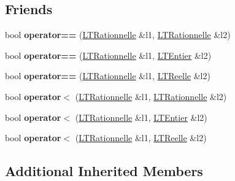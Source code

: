 \subsection*{Friends}
\begin{DoxyCompactItemize}
\item 
bool {\bfseries operator==} (\hyperlink{class_l_t_rationnelle}{L\+T\+Rationnelle} \&l1, \hyperlink{class_l_t_rationnelle}{L\+T\+Rationnelle} \&l2)\hypertarget{class_l_t_rationnelle_a4a1c3b9abfc9cf3bd7086fafb9e4ba0a}{}\label{class_l_t_rationnelle_a4a1c3b9abfc9cf3bd7086fafb9e4ba0a}

\item 
bool {\bfseries operator==} (\hyperlink{class_l_t_rationnelle}{L\+T\+Rationnelle} \&l1, \hyperlink{class_l_t_entier}{L\+T\+Entier} \&l2)\hypertarget{class_l_t_rationnelle_a876ef3ed5b945dd9d215467114da113e}{}\label{class_l_t_rationnelle_a876ef3ed5b945dd9d215467114da113e}

\item 
bool {\bfseries operator==} (\hyperlink{class_l_t_rationnelle}{L\+T\+Rationnelle} \&l1, \hyperlink{class_l_t_reelle}{L\+T\+Reelle} \&l2)\hypertarget{class_l_t_rationnelle_a777f8cc6504fb965bfb471d7d8ef88d1}{}\label{class_l_t_rationnelle_a777f8cc6504fb965bfb471d7d8ef88d1}

\item 
bool {\bfseries operator$<$} (\hyperlink{class_l_t_rationnelle}{L\+T\+Rationnelle} \&l1, \hyperlink{class_l_t_rationnelle}{L\+T\+Rationnelle} \&l2)\hypertarget{class_l_t_rationnelle_a733e4b41e081d731409ecc6d5bc7acd5}{}\label{class_l_t_rationnelle_a733e4b41e081d731409ecc6d5bc7acd5}

\item 
bool {\bfseries operator$<$} (\hyperlink{class_l_t_rationnelle}{L\+T\+Rationnelle} \&l1, \hyperlink{class_l_t_entier}{L\+T\+Entier} \&l2)\hypertarget{class_l_t_rationnelle_a1ca22dd7f4e80d45917fbaf48944b891}{}\label{class_l_t_rationnelle_a1ca22dd7f4e80d45917fbaf48944b891}

\item 
bool {\bfseries operator$<$} (\hyperlink{class_l_t_rationnelle}{L\+T\+Rationnelle} \&l1, \hyperlink{class_l_t_reelle}{L\+T\+Reelle} \&l2)\hypertarget{class_l_t_rationnelle_ad8107b1bd1525b558a2c51db0f4167cc}{}\label{class_l_t_rationnelle_ad8107b1bd1525b558a2c51db0f4167cc}

\end{DoxyCompactItemize}
\subsection*{Additional Inherited Members}


